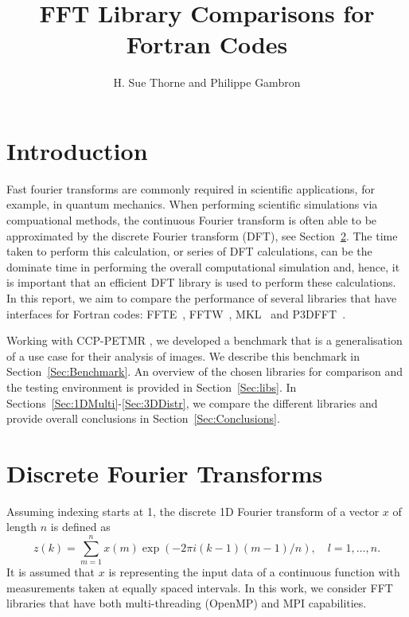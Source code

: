 \documentclass[a4paper]{article}
\begin{document}
\title{FFT Library Comparisons for Fortran Codes}
\author{H. Sue Thorne and Philippe Gambron}

\maketitle


\section{Introduction}

Fast fourier transforms are commonly required in scientific
applications, for example, in quantum mechanics. When performing
scientific simulations via compuational methods, the continuous
Fourier transform is often able to be approximated by the discrete
Fourier transform (DFT), see Section~\ref{Sec:FFT}. The time taken to
perform this calculation, or series of DFT calculations, can be the
dominate time in performing the overall computational simulation and,
hence, it is important that an efficient DFT library is used to
perform these calculations. In this report, we aim to compare the
performance of several libraries that have interfaces for Fortran
codes: FFTE~\cite{FFTE}, FFTW~\cite{FFTW}, MKL~\cite{MKL} and
P3DFFT~\cite{P3DFFT}.

Working with CCP-PETMR \cite{PETMR}, we developed a benchmark that is
a generalisation of a use case for their analysis of images. We
describe this benchmark in Section~\ref{Sec:Benchmark}. An overview of
the chosen libraries for comparison and the testing environment is
provided in Section~\ref{Sec:libs}. In
Sections~\ref{Sec:1DMulti}-\ref{Sec:3DDistr}, we compare the different
libraries and provide overall conclusions in
Section~\ref{Sec:Conclusions}.



\section{Discrete Fourier Transforms}\label{Sec:FFT}


Assuming indexing starts at 1, the discrete 1D Fourier transform of a
vector $x$ of length $n$ is defined as
\begin{equation}\label{Eqn:fft}
  z(k) = \sum_{m=1}^{n} x(m) \exp(-2\pi i (k-1) (m-1) / n), \quad l=1,\ldots,n.
\end{equation}
It is assumed that $x$ is representing the input data of a continuous
function with measurements taken at equally spaced intervals. In this
work, we consider FFT libraries that have both multi-threading
(OpenMP) and MPI capabilities.
\end{document}
